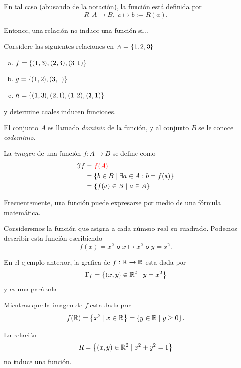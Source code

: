	
	En tal caso (abusando de la notaci\'on), la funci\'on est\'a definida por 
	$$
	R:A\to B, \; a \mapsto b:=R(a).
	$$



	Entonce, una relaci\'on no induce una funci\'on si...



	\begin{exmp}
		Considere las siguientes relaciones en $A=\left\{ 1,2,3 \right\}$
		\begin{enumerate}[(a)]
			\item $f=\left\{ (1,3),(2,3),(3,1) \right\}$
			\item $g=\left\{ (1,2), (3,1) \right\}$
			\item $h=\left\{ (1,3),(2,1),(1,2),(3,1) \right\}$
		\end{enumerate}
		y determine cuales inducen funciones.
	\end{exmp}
	




	El conjunto $A$ es llamado \emph{dominio} de la funci\'on, y al conjunto $B$ se le conoce \emph{codominio.}
	
	
	La \emph{imagen} de una funci\'on $f:A\to B$ se define como
	\begin{align*}
		\mathfrak{I}{f}&={\color{red} f(A)}\\
		&=\left\{ b \in B \mid \exists a \in A: b=f(a) \right\}\\
		&=\left\{ f(a)\in B \mid a \in A \right\}
	\end{align*}
	



	Frecuentemente, una funci\'on puede expresarse por medio de una f\'ormula matem\'atica. 
	\begin{exmp}
		Consideremos la funci\'on que asigna a cada n\'umero real su cuadrado. Podemos describir esta funci\'on escribiendo
		$$
		f(x)=x^{2} \texttt{ o } x\mapsto x^{2} \texttt{ o } y=x^{2}.
		$$
	\end{exmp}



	En el ejemplo anterior, la gr\'afica de $f:\mathbb{R} \to \mathbb{R}$ esta dada por 
	$$
	\Gamma_{f}=\left\{ (x,y)\in \mathbb{R}^{2}\mid y=x^{2} \right\}
	$$ y es una par\'abola.
	
	
	Mientras que la imagen de $f$ esta dada por 
	$$
	f(\mathbb{R})=\left\{ x^{2}\mid x\in \mathbb{R} \right\}=\left\{ y\in \mathbb{R} \mid y\geq 0 \right\}.
	$$



	\begin{exmp}
		La relaci\'on 
		$$
		R=\left\{ (x,y)\in \mathbb{R}^{2}\mid x^{2}+y^{2}=1 \right\}
		$$
		no induce una funci\'on.
	\end{exmp}
	



